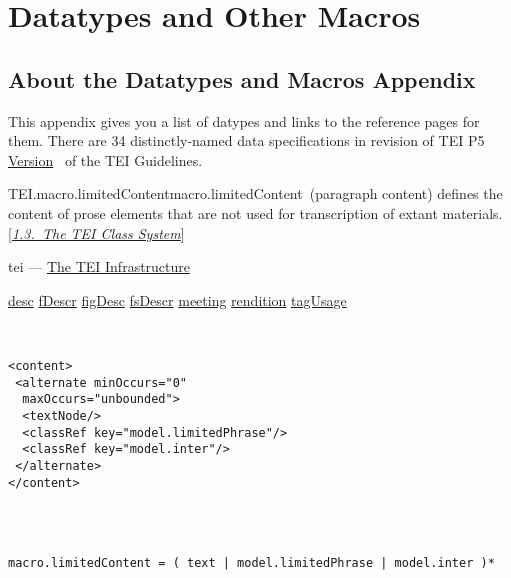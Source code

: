 
\section[{Datatypes and Other Macros}]{Datatypes and Other Macros}\label{REF-MACROS}
\subsection[{About the Datatypes and Macros Appendix}]{About the Datatypes and Macros Appendix}\par
This appendix gives you a list of datypes and links to the reference pages for them. There are 34 distinctly-named data specifications in revision  of TEI P5 \hyperref[ABTEI4]{Version}  of the TEI Guidelines.
\begin{reflist}
\item[]\begin{specHead}{TEI.macro.limitedContent}{macro.limitedContent} (paragraph content) defines the content of prose elements that are not used for transcription of extant materials. [\textit{\hyperref[STEC]{1.3.\ The TEI Class System}}]\end{specHead} 
    \item[{Module}]
  tei — \hyperref[ST]{The TEI Infrastructure}
    \item[{Used by}]
  \hyperref[TEI.desc]{desc} \hyperref[TEI.fDescr]{fDescr} \hyperref[TEI.figDesc]{figDesc} \hyperref[TEI.fsDescr]{fsDescr} \hyperref[TEI.meeting]{meeting} \hyperref[TEI.rendition]{rendition} \hyperref[TEI.tagUsage]{tagUsage}
    \item[{Content model}]
  \mbox{}\hfill\\[-10pt]\begin{Verbatim}[fontsize=\small]
<content>
 <alternate minOccurs="0"
  maxOccurs="unbounded">
  <textNode/>
  <classRef key="model.limitedPhrase"/>
  <classRef key="model.inter"/>
 </alternate>
</content>
    
\end{Verbatim}

    \item[{Declaration}]
  \mbox{}\hfill\\[-10pt]\begin{Verbatim}[fontsize=\small]
macro.limitedContent = ( text | model.limitedPhrase | model.inter )*
\end{Verbatim}

\end{reflist}  

